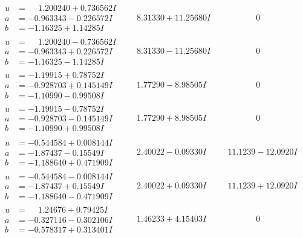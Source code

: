 \documentclass[1p]{elsarticle_modified}
\theoremstyle{definition}
\begin{document}
$$\begin{array}{c|c|c}
\begin{aligned}
u &= \phantom{-}1.200240 + 0.736562 I \\
a &= -0.963343 - 0.226572 I \\
b &= -1.16325 + 1.14285 I\end{aligned}
 & \phantom{-}8.31330 + 11.25680 I & \phantom{-0.000000 } 0 \\ \hline\begin{aligned}
u &= \phantom{-}1.200240 - 0.736562 I \\
a &= -0.963343 + 0.226572 I \\
b &= -1.16325 - 1.14285 I\end{aligned}
 & \phantom{-}8.31330 - 11.25680 I & \phantom{-0.000000 } 0 \\ \hline\begin{aligned}
u &= -1.19915 + 0.78752 I \\
a &= -0.928703 + 0.145149 I \\
b &= -1.10990 - 0.99508 I\end{aligned}
 & \phantom{-}1.77290 - 8.98505 I & \phantom{-0.000000 } 0 \\ \hline\begin{aligned}
u &= -1.19915 - 0.78752 I \\
a &= -0.928703 - 0.145149 I \\
b &= -1.10990 + 0.99508 I\end{aligned}
 & \phantom{-}1.77290 + 8.98505 I & \phantom{-0.000000 } 0 \\ \hline\begin{aligned}
u &= -0.544584 + 0.008144 I \\
a &= -1.87437 - 0.15549 I \\
b &= -1.188640 + 0.471909 I\end{aligned}
 & \phantom{-}2.40022 - 0.09330 I & \phantom{-}11.1239 - 12.0920 I \\ \hline\begin{aligned}
u &= -0.544584 - 0.008144 I \\
a &= -1.87437 + 0.15549 I \\
b &= -1.188640 - 0.471909 I\end{aligned}
 & \phantom{-}2.40022 + 0.09330 I & \phantom{-}11.1239 + 12.0920 I \\ \hline\begin{aligned}
u &= \phantom{-}1.24676 + 0.79425 I \\
a &= -0.327116 - 0.302106 I \\
b &= -0.578317 + 0.313401 I\end{aligned}
 & \phantom{-}1.46233 + 4.15403 I & \phantom{-0.000000 } 0\\

\end{array}$$
\end{document}
